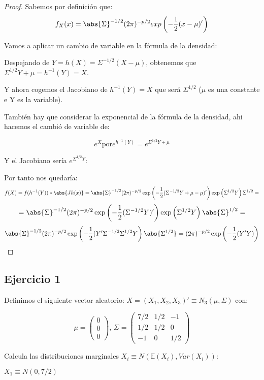 \documentclass[nochap]{apuntes}
\begin{document}
\begin{proof}
Sabemos por definición que:
\[
f_X(x)=\abs{\Sigma}^{-1/2}(2\pi)^{-p/2} exp \left( -\frac{1}{2}(x-\mu)' \right) 
\]

Vamos a aplicar un cambio de variable en la fórmula de la densidad:

Despejando de $Y = h(X)= \Sigma^{-1/2}(X-\mu)$, obtenemos que $\Sigma^{1/2}Y+\mu=h^{-1}(Y)=X$.

Y ahora cogemos el Jacobiano de $h^{-1}(Y)=X$ que será $\Sigma^{1/2}$ ($\mu$ es una constante e Y es la variable).

También hay que considerar la exponencial de la fórmula de la densidad, ahi hacemos el cambió de variable de:

$$e^X \text{por} e^{h^{-1}(Y)}=e^{\Sigma^{1/2}Y+\mu}$$ 

Y el Jacobiano sería $e^{\Sigma^{1/2}Y}$:
 

Por tanto nos quedaría:
\[
f(X) = f(h^{-1}(Y))*\abs{Jh(x)} = \abs{\Sigma}^{-1/2}(2 \pi)^{-p/2} \exp\left(-\frac{1}{2}(\Sigma^{-1/2}Y+\mu-\mu)'  \right) \exp\left( \Sigma^{1/2}Y \right) \Sigma^{1/2}  =
\]
\[
= \abs{\Sigma}^{-1/2}(2 \pi)^{-p/2} \exp\left(-\frac{1}{2}(\Sigma^{-1/2}Y)' \right) \exp\left( \Sigma^{1/2}Y \right) \abs{\Sigma}^{1/2} =
\]
\[
\abs{\Sigma}^{-1/2}(2 \pi)^{-p/2} \exp\left(-\frac{1}{2}(Y'\Sigma^{-1/2}\Sigma^{1/2}Y \right) \abs{\Sigma^{1/2}} = (2 \pi)^{-p/2} \exp\left(-\frac{1}{2}(Y'Y) \right) 
\]
\end{proof}


\subsection{Ejercicio 1}
Definimos el siguiente vector aleatorio: $X = (X_1,X_2,X_3)' \equiv N_3(\mu, \Sigma)$ con:

\[
\mu=
\left(
\begin{array}{c}
0\\
0\\
0
\end{array}
\right) \text{,       }
\Sigma=
\left(
\begin{array}{ccc}
7/2& 1/2& -1 \\
1/2& 1/2& 0 \\
-1& 0& 1/2
\end{array}
\right)
\]

\ppart Calcula las distribuciones marginales $X_i \equiv N(\mathbb{E}(X_i), Var(X_i))$:

$X_1\equiv N(0, 7/2)$
\end{document}
